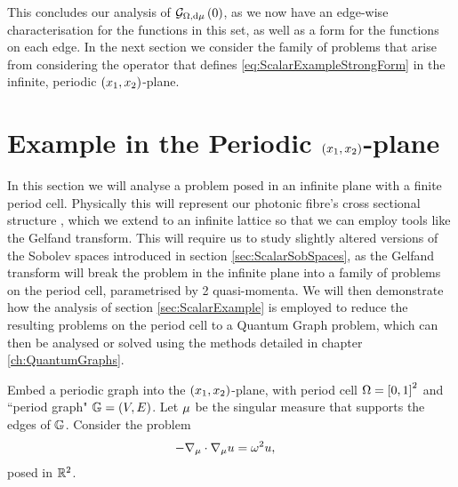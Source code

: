 This concludes our analysis of $\mathcal{G}_{ \Omega, \mathrm{d}\mu}\left( 0 \right)$, as we now have an edge-wise characterisation for the functions in this set, as well as a form for the functions on each edge.
In the next section we consider the family of problems that arise from considering the operator that defines \eqref{eq:ScalarExampleStrongForm} in the infinite, periodic $\left( x_1,x_2 \right)$-plane.

\section{Example in the Periodic $\left( x_1,x_2 \right)$-plane} \label{sec:ScalarSystem}
In this section we will analyse a problem posed in an infinite plane with a finite period cell.
Physically this will represent our photonic fibre's cross sectional structure , which we extend to an infinite lattice so that we can employ tools like the Gelfand transform.
This will require us to study slightly altered versions of the Sobolev spaces introduced in section \ref{sec:ScalarSobSpaces}, as the Gelfand transform will break the problem in the infinite plane into a family of problems on the period cell, parametrised by 2 quasi-momenta.
We will then demonstrate how the analysis of section \ref{sec:ScalarExample} is employed to reduce the resulting problems on the period cell to a Quantum Graph problem, which can then be analysed or solved using the methods detailed in chapter \ref{ch:QuantumGraphs}. \newline

Embed a periodic graph into the $\left( x_1,x_2 \right)$-plane, with period cell $\Omega = \left[ 0,1 \right]^2$ and ``period graph" $\mathbb{G}=(V,E)$.
Let $\mu$ be the singular measure that supports the edges of $\mathbb{G}$. 
Consider the problem
\begin{align} \label{eq:WholeSpaceScalarProblem}
	-\nabla_\mu \cdot \nabla_\mu u &= \omega^2 u,
\end{align}
posed in $\mathbb{R}^2$. 

